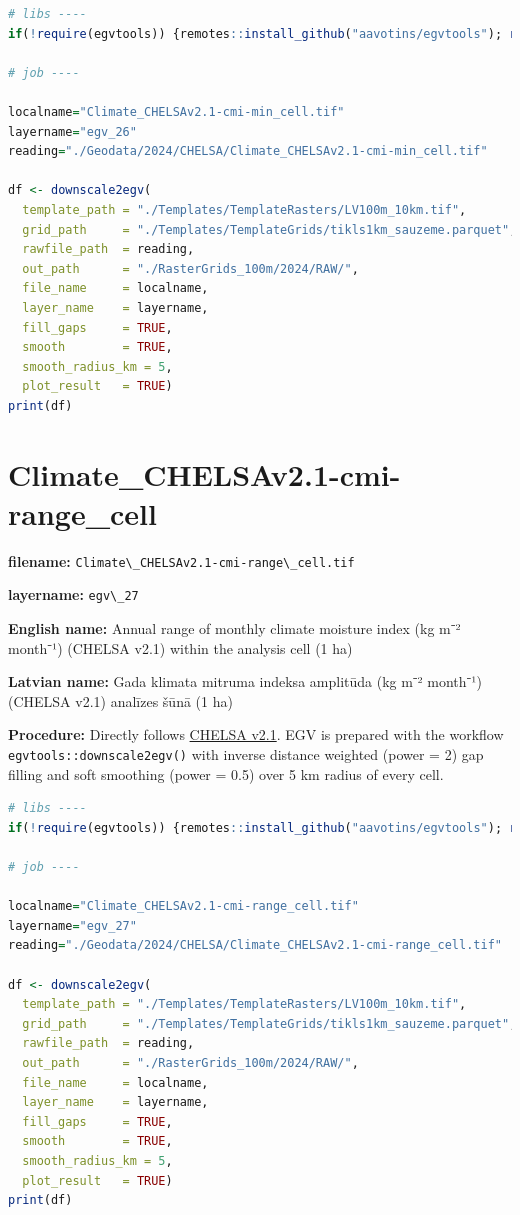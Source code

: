 \documentclass[
]{book}
\newcommand{\passthrough}[1]{#1}
\begin{document}
\begin{lstlisting}[language=R]
# libs ----
if(!require(egvtools)) {remotes::install_github("aavotins/egvtools"); require(egvtools)}

# job ----

localname="Climate_CHELSAv2.1-cmi-min_cell.tif"
layername="egv_26"
reading="./Geodata/2024/CHELSA/Climate_CHELSAv2.1-cmi-min_cell.tif"

df <- downscale2egv(
  template_path = "./Templates/TemplateRasters/LV100m_10km.tif",
  grid_path     = "./Templates/TemplateGrids/tikls1km_sauzeme.parquet",
  rawfile_path  = reading,
  out_path      = "./RasterGrids_100m/2024/RAW/",
  file_name     = localname,
  layer_name    = layername,
  fill_gaps     = TRUE,
  smooth        = TRUE,
  smooth_radius_km = 5,
  plot_result   = TRUE)
print(df)
\end{lstlisting}

\section{Climate\_CHELSAv2.1-cmi-range\_cell}\label{ch06.027}

\textbf{filename:} \passthrough{\lstinline!Climate\_CHELSAv2.1-cmi-range\_cell.tif!}

\textbf{layername:} \passthrough{\lstinline!egv\_27!}

\textbf{English name:} Annual range of monthly climate moisture index (kg m⁻² month⁻¹) (CHELSA v2.1) within the analysis cell (1 ha)

\textbf{Latvian name:} Gada klimata mitruma indeksa amplitūda (kg m⁻² month⁻¹) (CHELSA v2.1) analīzes šūnā (1 ha)

\textbf{Procedure:} Directly follows \hyperref[Ch04.11]{CHELSA v2.1}. EGV is prepared with the
workflow \passthrough{\lstinline!egvtools::downscale2egv()!} with inverse distance weighted (power = 2)
gap filling and soft smoothing (power = 0.5) over 5 km radius of every cell.

\begin{lstlisting}[language=R]
# libs ----
if(!require(egvtools)) {remotes::install_github("aavotins/egvtools"); require(egvtools)}

# job ----

localname="Climate_CHELSAv2.1-cmi-range_cell.tif"
layername="egv_27"
reading="./Geodata/2024/CHELSA/Climate_CHELSAv2.1-cmi-range_cell.tif"

df <- downscale2egv(
  template_path = "./Templates/TemplateRasters/LV100m_10km.tif",
  grid_path     = "./Templates/TemplateGrids/tikls1km_sauzeme.parquet",
  rawfile_path  = reading,
  out_path      = "./RasterGrids_100m/2024/RAW/",
  file_name     = localname,
  layer_name    = layername,
  fill_gaps     = TRUE,
  smooth        = TRUE,
  smooth_radius_km = 5,
  plot_result   = TRUE)
print(df)
\end{lstlisting}
\end{document}
